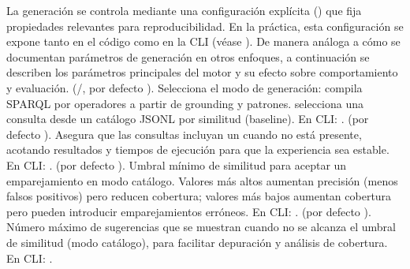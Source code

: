 {}\markdownRendererInterblockSeparator
{}La generación se controla mediante una configuración explícita () que fija propiedades relevantes para reproducibilidad. En la práctica, esta configuración se expone tanto en el código como en la CLI (véase ).\markdownRendererInterblockSeparator
{}De manera análoga a cómo se documentan parámetros de generación en otros enfoques, a continuación se describen los parámetros principales del motor y su efecto sobre comportamiento y evaluación.\markdownRendererInterblockSeparator
{}\markdownRendererUlBegin
\markdownRendererUlItem {} (/, por defecto ). Selecciona el modo de generación:\markdownRendererInterblockSeparator
{}\markdownRendererUlBeginTight
\markdownRendererUlItem {} compila SPARQL por operadores a partir de grounding y patrones.\markdownRendererUlItemEnd 
\markdownRendererUlItem {} selecciona una consulta desde un catálogo JSONL por similitud (baseline). En CLI: .\markdownRendererUlItemEnd 
\markdownRendererUlEndTight \markdownRendererUlItemEnd 
\markdownRendererUlItem {} (por defecto ). Asegura que las consultas  incluyan un  cuando no está presente, acotando resultados y tiempos de ejecución para que la experiencia sea estable. En CLI: .\markdownRendererUlItemEnd 
\markdownRendererUlItem {} (por defecto ). Umbral mínimo de similitud para aceptar un emparejamiento en modo catálogo. Valores más altos aumentan precisión (menos falsos positivos) pero reducen cobertura; valores más bajos aumentan cobertura pero pueden introducir emparejamientos erróneos. En CLI: .\markdownRendererUlItemEnd 
\markdownRendererUlItem {} (por defecto ). Número máximo de sugerencias que se muestran cuando no se alcanza el umbral de similitud (modo catálogo), para facilitar depuración y análisis de cobertura. En CLI: .\markdownRendererUlItemEnd 
